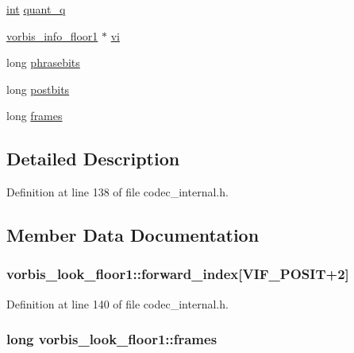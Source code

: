 \begin{DoxyCompactItemize}
\item 
\hyperlink{xmltok_8h_a5a0d4a5641ce434f1d23533f2b2e6653}{int} \hyperlink{structvorbis__look__floor1_adac4ee5bff92d47ed24050b19c4cf01b}{quant\+\_\+q}
\item 
\hyperlink{structvorbis__info__floor1}{vorbis\+\_\+info\+\_\+floor1} $\ast$ \hyperlink{structvorbis__look__floor1_ade3db5b54943aea50868288f4d077a34}{vi}
\item 
long \hyperlink{structvorbis__look__floor1_a10403077a7c2ffb6c8c1e94278621076}{phrasebits}
\item 
long \hyperlink{structvorbis__look__floor1_a0f1524a3ee7ca6d2e1aea806119a0c60}{postbits}
\item 
long \hyperlink{structvorbis__look__floor1_a78bec579433dd07b15e2479d53b5d957}{frames}
\end{DoxyCompactItemize}


\subsection{Detailed Description}


Definition at line 138 of file codec\+\_\+internal.\+h.



\subsection{Member Data Documentation}
\subsubsection[{\texorpdfstring{forward\+\_\+index}{forward_index}}]{ vorbis\+\_\+look\+\_\+floor1\+::forward\+\_\+index\mbox{[}{\bf V\+I\+F\+\_\+\+P\+O\+S\+IT}+2\mbox{]}}\hypertarget{structvorbis__look__floor1_aef7094d8e6608a42938cf39a0f5373ab}{}\label{structvorbis__look__floor1_aef7094d8e6608a42938cf39a0f5373ab}


Definition at line 140 of file codec\+\_\+internal.\+h.

\subsubsection[{\texorpdfstring{frames}{frames}}]{\setlength{\rightskip}{0pt plus 5cm}long vorbis\+\_\+look\+\_\+floor1\+::frames}\hypertarget{structvorbis__look__floor1_a78bec579433dd07b15e2479d53b5d957}{}\label{structvorbis__look__floor1_a78bec579433dd07b15e2479d53b5d957}



